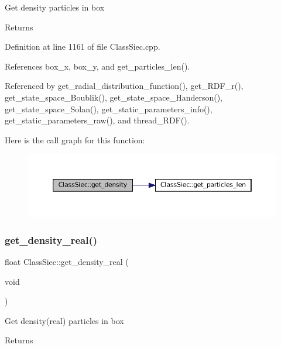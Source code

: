 Get density particles in box \begin{DoxyReturn}{Returns}

\end{DoxyReturn}


Definition at line 1161 of file Class\+Siec.\+cpp.



References box\+\_\+x, box\+\_\+y, and get\+\_\+particles\+\_\+len().



Referenced by get\+\_\+radial\+\_\+distribution\+\_\+function(), get\+\_\+\+R\+D\+F\+\_\+r(), get\+\_\+state\+\_\+space\+\_\+\+Boublik(), get\+\_\+state\+\_\+space\+\_\+\+Handerson(), get\+\_\+state\+\_\+space\+\_\+\+Solan(), get\+\_\+static\+\_\+parameters\+\_\+info(), get\+\_\+static\+\_\+parameters\+\_\+raw(), and thread\+\_\+\+R\+D\+F().

Here is the call graph for this function\+:\nopagebreak
\begin{figure}[H]
\begin{center}
\leavevmode
\includegraphics[width=350pt]{classClassSiec_a1ea898d8e6cb52ffc47e7490e48894e4_cgraph}
\end{center}
\end{figure}
\mbox{\label{classClassSiec_aad61574e5a2c57c21f3404b7a60ee189}} 
\subsubsection{\texorpdfstring{get\+\_\+density\+\_\+real()}{get\_density\_real()}}
{\footnotesize\ttfamily float Class\+Siec\+::get\+\_\+density\+\_\+real (\begin{DoxyParamCaption}\item[{void}]{ }\end{DoxyParamCaption})}

Get density(real) particles in box \begin{DoxyReturn}{Returns}

\end{DoxyReturn}



